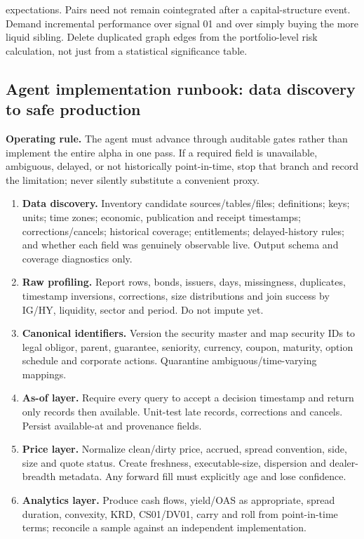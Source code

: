 \documentclass[10pt]{article}
\begin{document}
expectations. Pairs need not remain cointegrated after a capital-structure event. Demand incremental performance over signal 01 and over simply buying the more liquid sibling. Delete duplicated graph edges from the portfolio-level risk calculation, not just from a statistical significance table.
\subsection{Agent implementation runbook: data discovery to safe production}
\textbf{Operating rule.} The agent must advance through auditable gates rather than implement the entire alpha in one pass. If a required field is unavailable, ambiguous, delayed, or not historically point-in-time, stop that branch and record the limitation; never silently substitute a convenient proxy.
\begin{enumerate}[leftmargin=2em,label=\textbf{A\arabic*.}]
\item \textbf{Data discovery.} Inventory candidate sources/tables/files; definitions; keys; units; time zones; economic, publication and receipt timestamps; corrections/cancels; historical coverage; entitlements; delayed-history rules; and whether each field was genuinely observable live. Output schema and coverage diagnostics only.
\item \textbf{Raw profiling.} Report rows, bonds, issuers, days, missingness, duplicates, timestamp inversions, corrections, size distributions and join success by IG/HY, liquidity, sector and period. Do not impute yet.
\item \textbf{Canonical identifiers.} Version the security master and map security IDs to legal obligor, parent, guarantee, seniority, currency, coupon, maturity, option schedule and corporate actions. Quarantine ambiguous/time-varying mappings.
\item \textbf{As-of layer.} Require every query to accept a decision timestamp and return only records then available. Unit-test late records, corrections and cancels. Persist available-at and provenance fields.
\item \textbf{Price layer.} Normalize clean/dirty price, accrued, spread convention, side, size and quote status. Create freshness, executable-size, dispersion and dealer-breadth metadata. Any forward fill must explicitly age and lose confidence.
\item \textbf{Analytics layer.} Produce cash flows, yield/OAS as appropriate, spread duration, convexity, KRD, CS01/DV01, carry and roll from point-in-time terms; reconcile a sample against an independent implementation.

\end{enumerate}
\end{document}
